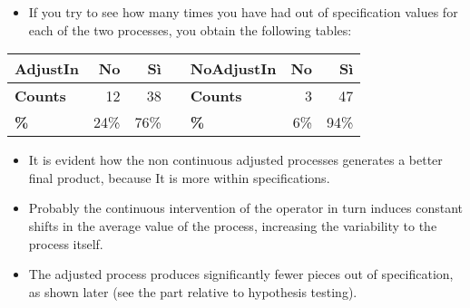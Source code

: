 \begin{frame}
  \begin{itemize}
    \item If you try to see how many times you have had out of specification values for each of the two processes, you obtain the following tables:
  \end{itemize}
  \begin{center}
    \begin{tabular}{|l|rr|c|l|rr|}
      \hline	
      \textbf{AdjustIn} & \textbf{No} & \textbf{S\`i} & & \textbf{NoAdjustIn} &  \textbf{No} & \textbf{S\`i} \\
      \hline
      \textbf{Counts} & 12 & 38 & & \textbf{Counts} & 3 & 47 \\
      \textbf{\%} & 24\% & 76\% & & \textbf{\%} & 6\% & 94\% \\
      \hline
    \end{tabular} 
  \end{center}
  \begin{itemize}
    \item It is evident how the non continuous adjusted processes generates a better final product, because It is more within specifications.
    \item Probably the continuous intervention of the operator in turn induces constant shifts in the average value of the process, increasing the variability to the process itself.
    \item The adjusted process produces significantly fewer pieces out of specification, as shown later (see the part relative to hypothesis testing).
  \end{itemize}
\end{frame}


